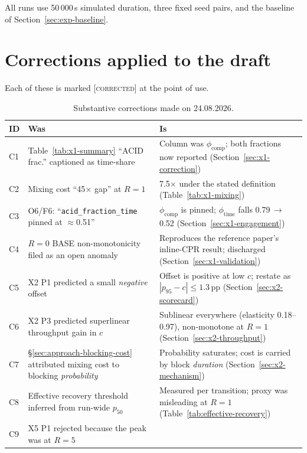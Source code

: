 All runs use 50\,000\,s simulated duration, three fixed seed pairs, and
the baseline of Section~\ref{sec:exp-baseline}.

\section{Corrections applied to the draft}\label{sec:reg-corrections}

Each of these is marked \textsc{[corrected]} at the point of use.

\begin{table}[htbp]
\centering
\caption{Substantive corrections made on 24.08.2026.}
\label{tab:reg-corrections}
\small
\begin{tabular}{l p{4.4cm} p{5.2cm}}
\toprule
ID & Was & Is \\
\midrule
C1 & Table~\ref{tab:x1-summary} ``ACID frac.'' captioned as time-share
   & Column was $\phi_{\mathrm{comp}}$; both fractions now reported
     (Section~\ref{sec:x1-correction}) \\
C2 & Mixing cost ``45$\times$ gap'' at $R = 1$
   & 7.5$\times$ under the stated definition
     (Table~\ref{tab:x1-mixing}) \\
C3 & O6/F6: ``\texttt{acid\_fraction\_time} pinned at $\approx$0.51''
   & $\phi_{\mathrm{comp}}$ is pinned; $\phi_{\mathrm{time}}$ falls
     0.79\,$\to$\,0.52 (Section~\ref{sec:x1-engagement}) \\
C4 & $R = 0$ BASE non-monotonicity filed as an open anomaly
   & Reproduces the reference paper's inline-CPR result; discharged
     (Section~\ref{sec:x1-validation}) \\
C5 & X2 P1 predicted a small \emph{negative} offset
   & Offset is positive at low $c$; restate as $|p_{95}-c| \le 1.3$\,pp
     (Section~\ref{sec:x2-scorecard}) \\
C6 & X2 P3 predicted superlinear throughput gain in $c$
   & Sublinear everywhere (elasticity 0.18--0.97), non-monotone at
     $R = 1$ (Section~\ref{sec:x2-throughput}) \\
C7 & \S\ref{sec:approach-blocking-cost} attributed mixing cost to
     blocking \emph{probability}
   & Probability saturates; cost is carried by block \emph{duration}
     (Section~\ref{sec:x2-mechanism}) \\
C8 & Effective recovery threshold inferred from run-wide $p_{50}$
   & Measured per transition; proxy was misleading at $R = 1$
     (Table~\ref{tab:effective-recovery}) \\
C9 & X5 P1 rejected because the peak was at $R = 5$

\end{tabular}
\end{table}
